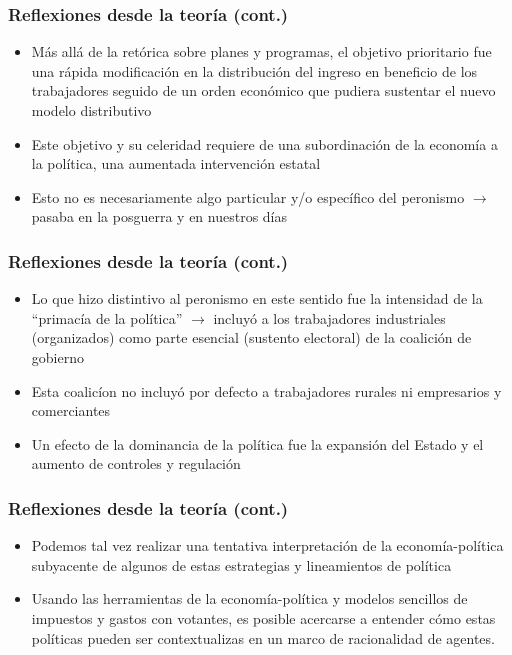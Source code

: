 \documentclass[14pt,aspectratio=169]{beamer}
\begin{document}
\begin{frame}\frametitle{Reflexiones desde la teoría (cont.)}
   \begin{itemize} \itemsep 10pt
   \item Más allá de la retórica sobre planes y programas, el objetivo
     prioritario fue una rápida modificación en la distribución del
     ingreso en beneficio de los trabajadores seguido de un orden
     económico que pudiera sustentar el nuevo modelo distributivo
     \item Este objetivo y su celeridad requiere de una subordinación
       de la economía a la política, una aumentada intervención
       estatal
       \item Esto no es necesariamente algo particular y/o específico
         del peronismo $\longrightarrow$ pasaba en la posguerra y en
         nuestros días
   \end{itemize}
 \end{frame}




\begin{frame}\frametitle{Reflexiones desde la teoría (cont.)}
   \begin{itemize} \itemsep 10pt
   \item Lo que hizo distintivo al peronismo en este sentido fue la
     intensidad de la ``primacía de la política'' $\longrightarrow$
     incluyó a los trabajadores industriales (organizados) como parte esencial
     (sustento electoral) de la
     coalición de gobierno
     \item Esta coalicíon no incluyó por defecto a trabajadores
       rurales ni empresarios y comerciantes
       \item Un efecto de la dominancia de la política fue la
         expansión del Estado y el aumento de controles y regulación
\end{itemize}
       \end{frame}



 
\begin{frame}\frametitle{Reflexiones desde la teoría (cont.)}
   \begin{itemize} \itemsep 10pt
   \item Podemos tal vez realizar una tentativa interpretación de la
     economía-política subyacente de algunos de estas estrategias y
     lineamientos de política
     \item Usando las herramientas de la economía-política y modelos
       sencillos de impuestos y gastos con votantes, es posible
       acercarse a entender cómo estas políticas pueden ser
       contextualizas en un marco de racionalidad de agentes.
\end{itemize}
     \end{frame}
\end{document}
